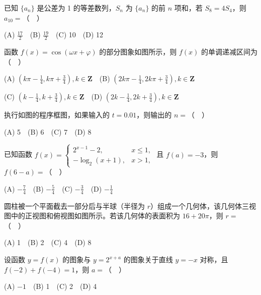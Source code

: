 \begin{question}
已知 $\{a_n\}$ 是公差为 1 的等差数列，$S_n$ 为 $\{a_n\}$ 的前 $n$ 项和，若 $S_8=4S_4$，则 $a_{10}=$（　）

(A) $\frac{17}2$　(B) $\frac{19}2$　(C) 10　(D) 12

\Needspace{0.4\textheight}
\end{question}
\begin{question}
函数 $f(x)=\cos(\omega x+\varphi)$ 的部分图象如图所示，则 $f(x)$ 的单调递减区间为（　）
\nopagebreak[4]
\begin{center}\end{center}
\nopagebreak[4]
(A) $(k\pi-\frac14,k\pi+\frac34),k\in\mathbf Z$　(B) $(2k\pi-\frac14,2k\pi+\frac34),k\in\mathbf Z$

(C) $(k-\frac14,k+\frac34),k\in\mathbf Z$　(D) $(2k-\frac14,2k+\frac34),k\in\mathbf Z$

\Needspace{0.4\textheight}
\end{question}
\begin{question}
执行如图的程序框图，如果输入的 $t=0.01$，则输出的 $n=$（　）
\nopagebreak[4]
\begin{center}\end{center}
\nopagebreak[4]
(A) 5　(B) 6　(C) 7　(D) 8

\end{question}
\begin{question}
已知函数 $f(x)=\begin{cases}2^{x-1}-2,&x\leqslant1,\\-\log_2(x+1),&x>1,\end{cases}$ 且 $f(a)=-3$，则 $f(6-a)=$（　）

(A) $-\frac74$　(B) $-\frac54$　(C) $-\frac34$　(D) $-\frac14$

\Needspace{0.4\textheight}
\end{question}
\begin{question}
圆柱被一个平面截去一部分后与半球（半径为 $r$）组成一个几何体，该几何体三视图中的正视图和俯视图如图所示。若该几何体的表面积为 $16+20\pi$，则 $r=$（　）
\nopagebreak[4]
\begin{center}\end{center}
\nopagebreak[4]
\nopagebreak[4]
\begin{center}\end{center}
\nopagebreak[4]
(A) 1　(B) 2　(C) 4　(D) 8

\end{question}
\begin{question}
设函数 $y=f(x)$ 的图象与 $y=2^{x+a}$ 的图象关于直线 $y=-x$ 对称，且 $f(-2)+f(-4)=1$，则 $a=$（　）

(A) $-1$　(B) 1　(C) 2　(D) 4

\end{question}

